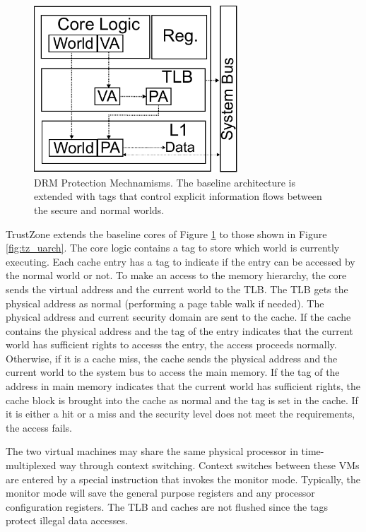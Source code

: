     \begin{figure}
        \begin{center}
            \includegraphics[width=3in]{figs/tz_tags.pdf}
            \caption{DRM Protection Mechnamisms. The baseline architecture is 
            extended with tags that control explicit information flows between 
        the secure and normal worlds.}
            \label{fig:baseline}
        \end{center}
    \end{figure}

    TrustZone extends the baseline cores of Figure \ref{fig:baseline} to
    those shown in Figure \ref{fig:tz_uarch}. The core logic contains a tag to 
    store which world is currently executing. Each cache entry has a tag to 
    indicate if the entry can be accessed by the normal world or not. To make 
    an access to the memory hierarchy, the core sends the virtual address and 
    the current world to the TLB. The TLB gets the physical address as normal 
    (performing a page table walk if needed). The physical address and current 
    security domain are sent to the cache. If the cache contains the physical 
    address and the tag of the entry indicates that the current world has 
    sufficient rights to accesss the entry, the access proceeds normally.  
    Otherwise, if it is a cache miss, the cache sends the physical address and 
    the current world to the system bus to access the main memory. If the tag 
    of the address in main memory indicates that the current world has 
    sufficient rights, the cache block is brought into the cache as normal and 
    the tag is set in the cache. If it is either a hit or a miss and the 
    security level does not meet the requirements, the access fails.

    The two virtual machines may share the same physical processor in 
    time-multiplexed way through context switching. Context switches between 
    these VMs are entered by a special instruction that invokes the monitor 
    mode.  Typically, the monitor mode will save the general purpose registers 
    and any processor configuration registers. The TLB and caches are not 
    flushed since the tags protect illegal data accesses.

